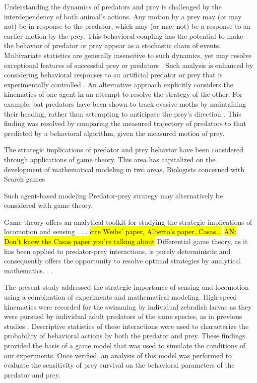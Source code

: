 \documentclass[]{rsos}%
\begin{document}
Understanding the dynamics of predators and prey is challenged by the interdependency of both animal's actions.
Any motion by a prey may (or may not) be in response to the predator, which may (or may not) be a response to an earlier motion by the prey. 
This behavioral coupling has the potential to make the behavior of predator or prey appear as a stochastic chain of events.
Multivariate statistics are generally insensitive to such dynamics, yet may resolve exceptional features of successful prey \cite{Walker:2005vn} or predators \cite{Wainwright:2001ufa}.
Such analysis is enhanced by considering behavioral responses to an artificial predator or prey that is experimentally controlled \cite{Gabbiani:1999wz,Stewart:2014cma}.
An alternative approach explicitly considers the kinematics of one agent in an attempt to resolve the strategy of the other.
For example, bat predators have been shown to track evasive moths by maintaining their heading, rather than attempting to anticipate the prey's direction \cite{Ghose:2006dk}. 
This finding was resolved by comparing the measured trajectory of predators to that predicted by a behavioral algorithm, given the measured motion of prey.

The strategic implications of predator and prey behavior have been considered through applications of game theory.
This area has capitalized on the development of mathematical modeling in two areas.
Biologists concerned with Search games 


Such agent-based modeling 
Predator-prey strategy may alternatively be considered with game theory.

Game theory offers an analytical toolkit for studying the strategic implications of locomotion and sensing . . .
\hl{cite Weihs' paper, Alberto's paper, Casas...}\cite{Weihs:1984tb,Soto:2015cj} \hl{AN: Don't know the Casas paper you're talking about}
Differential game theory, as it has been applied to predator-prey interactions, is purely deterministic and consequently offers the opportunity to resolve optimal strategies by analytical mathematics. . .

The present study addressed the strategic importance of sensing and locomotion using a combination of experiments and mathematical modeling. 
High-speed kinematics were recorded for the swimming by individual zebrafish larvae as they were pursued by individual adult predators of the same species, as in previous studies \cite{Stewart:2014cma, Soto:2015cj}.
Descriptive statistics of these interactions were used to characterize the probability of behavioral actions by both the predator and prey.
These findings provided the basis of a game model that was used to simulate the conditions of our experiments. 
Once verified, an analysis of this model was performed to evaluate the sensitivity of prey survival on the behavioral parameters of the predator and prey.
\end{document}
